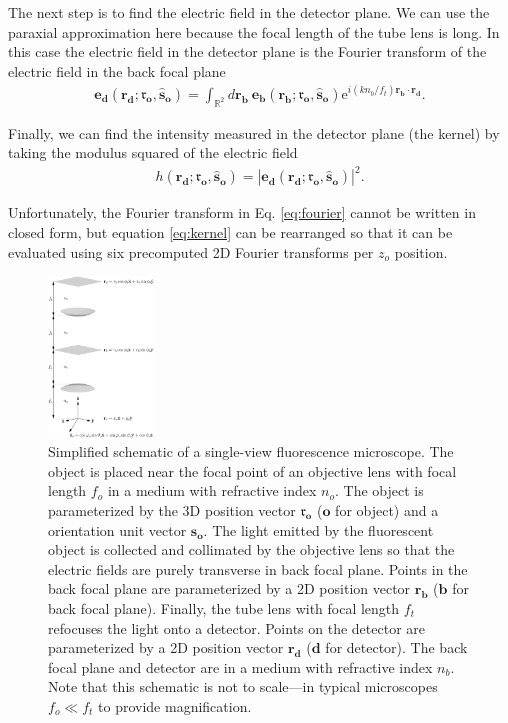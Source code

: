 \documentclass[11pt]{article}
\newcommand{\me}{\mathrm{e}}
\providecommand{\mb}[1]{\mathbf{#1}}
\providecommand{\ro}[1]{\mathbf{\mathfrak{r}_o}}
\providecommand{\so}[1]{\mathbf{\hat{s}_o}}
\providecommand{\rb}[1]{\mathbf{r_b}}
\providecommand{\rd}[1]{\mathbf{r_d}}
\begin{document}
The next step is to find the electric field in the detector plane. We can use
the paraxial approximation here because the focal length of the tube lens is
long. In this case the electric field in the detector plane is the Fourier
transform of the electric field in the back focal plane
\begin{align}
  \mb{e_d}(\rd{};\ro{}, \so{}) = \int_{\mathbb{R}^2}d\rb{}\ \mb{e_b}(\rb{};\ro{}, \so{}) \me^{i(kn_b/f_t)\rb{}\cdot\rd{}}. \label{eq:fourier}
\end{align}

Finally, we can find the intensity measured in the detector plane (the kernel)
by taking the modulus squared of the electric field
\begin{align}
  h(\rd{}; \ro{}, \so{}) = |\mb{e_d}(\rd{};\ro{}, \so{})|^2. \label{eq:kernel}
\end{align}

Unfortunately, the Fourier transform in Eq. \ref{eq:fourier} cannot be written
in closed form, but equation \ref{eq:kernel} can be rearranged so that it can be
evaluated using six precomputed 2D Fourier transforms per $z_o$ position.

\begin{figure}[h]
 \captionsetup{width=1.0\linewidth}
 \centering
   \centering
   \includegraphics[width = 0.25\textwidth]{../figures/schematic.pdf}
   \caption{Simplified schematic of a single-view fluorescence microscope. The
     object is placed near the focal point of an objective lens with focal
     length $f_{o}$ in a medium with refractive index $n_o$. The object is
     parameterized by the 3D position vector $\ro{}$ ($\mb{o}$ for object) and a
     orientation unit vector $\so{}$. The light emitted by the fluorescent
     object is collected and collimated by the objective lens so that the
     electric fields are purely transverse in back focal plane. Points in the
     back focal plane are parameterized by a 2D position vector $\rb{}$
     ($\mb{b}$ for back focal plane). Finally, the tube lens with focal length
     $f_t$ refocuses the light onto a detector. Points on the detector are
     parameterized by a 2D position vector $\rd{}$ ($\mb{d}$ for detector). The
     back focal plane and detector are in a medium with refractive index
     $n_b$. Note that this schematic is not to scale---in typical microscopes
     $f_o \ll f_t$ to provide magnification.}
   \label{fig:frames_a}
\end{figure}
\end{document}
